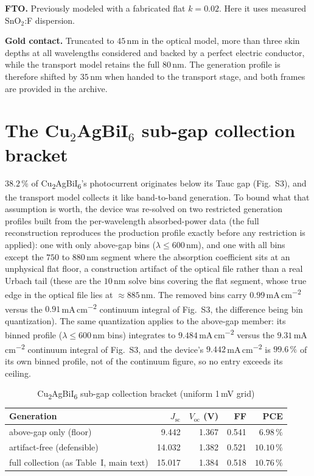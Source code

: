 \documentclass[lettersize,journal,onecolumn]{IEEEtran}
\newcommand{\CABI}{Cu\textsubscript{2}AgBiI\textsubscript{6}}
\newcommand{\percm}{\,mA\,cm\textsuperscript{$-$2}}
\begin{document}
\textbf{FTO.} Previously modeled with a fabricated flat $k=0.02$. Here it uses
measured SnO$_2$:F dispersion.

\textbf{Gold contact.} Truncated to $45\,$nm in the optical model, more than
three skin depths at all wavelengths considered and backed by a perfect
electric conductor, while the transport model retains the full $80\,$nm. The
generation profile is therefore shifted by $35\,$nm when handed to the
transport stage, and both frames are provided in the archive.

\section{The Cu$_2$AgBiI$_6$ sub-gap collection bracket}
$38.2\,\%$ of \CABI's photocurrent originates below its Tauc gap (Fig.~S3),
and the transport model collects it like band-to-band generation. To bound
what that assumption is worth, the device was re-solved on two restricted
generation profiles built from the per-wavelength absorbed-power data (the
full reconstruction reproduces the production profile exactly before any
restriction is applied): one with only above-gap bins
($\lambda \leq 600\,$nm), and one with all bins except the $750$ to $880\,$nm
segment where the absorption coefficient sits at an unphysical flat floor,
a construction artifact of the optical file rather than a real Urbach tail
(these are the $10\,$nm solve bins covering the flat segment, whose true edge
in the optical file lies at ${\approx}885\,$nm. The removed bins carry
$0.99$\percm{} versus the $0.91$\percm{} continuum integral of Fig.~S3, the
difference being bin quantization). The same quantization applies to the
above-gap member: its binned profile ($\lambda \leq 600$\,nm bins)
integrates to $9.484$\percm{} versus the $9.31$\percm{} continuum integral
of Fig.~S3, and the device's $9.442$\percm{} is $99.6\,\%$ of its own
binned profile, not of the continuum figure, so no entry exceeds its
ceiling.

\begin{table}[!ht]
\caption{\CABI{} sub-gap collection bracket (uniform 1\,mV grid)}
\centering\small
\begin{tabular}{lrrrr}
\toprule
Generation & $J_\mathrm{sc}$ & $V_\mathrm{oc}$ (V) & FF & PCE \\
\midrule
above-gap only (floor)        &  9.442 & 1.367 & 0.541 & $6.98\,\%$ \\
artifact-free (defensible)    & 14.032 & 1.382 & 0.521 & $10.10\,\%$ \\
full collection (as Table~I, main text) & 15.017 & 1.384 & 0.518 & $10.76\,\%$ \\
\bottomrule
\end{tabular}
\end{table}
\end{document}
